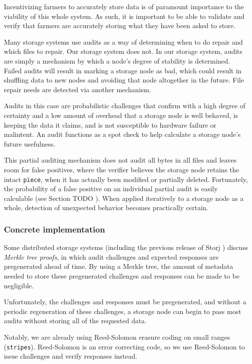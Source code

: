 \documentclass[a4paper,10pt]{article} \usepackage[utf8]{inputenc}
\newcommand{\x}[1]{{\tt #1}} \newcommand{\code}[1]{{\tt #1}}
\newcommand{\todo}[1]{{\color{red} TODO #1}}
\begin{document}
Incentivizing farmers to accurately store data is of paramount importance to
the viability of this whole system. As such, it is important to be able to
validate and verify that farmers are accurately storing what they have been
asked to store.

Many storage systems use audits as a way of determining when to do repair and
which files to repair. Our storage system does not. In our storage system,
audits are simply a mechanism by which a node's degree of stability is
determined. Failed audits will result in marking a storage node as bad, which
could result in shuffling data to new nodes and avoiding that node altogether
in the future. File repair needs are detected via another mechanism.

Audits in this case are probabilistic challenges that confirm with a high
degree of certainty and a low amount of overhead that a storage node is well
behaved, is keeping the data it claims, and is not susceptible to hardware
failure or malintent. An audit functions as a spot check to help calculate a
storage node's future usefulness.

This partial auditing mechanism does not audit all bytes in all files and
leaves room for false positives, where the verifier believes the storage node
retains the intact \x{piece}, when it has actually been modified or partially
deleted. Fortunately, the probability of a false positive on an individual
partial audit is easily calculable (see Section \todo{}). When applied
iteratively to a storage node as a whole, detection of unexpected behavior
becomes practically certain.

\subsubsection{Concrete implementation}

Some distributed storage systems (including the previous release of Storj
\cite{storj-v2}) discuss {\em Merkle tree proofs}, in which audit challenges
and expected responses are pregenerated ahead of time. By using a Merkle tree,
the amount of metadata needed to store these pregenerated challenges and
responses can be made to be negligible.

Unfortunately, the challenges and responses must be pregenerated, and without
a periodic regeneration of these challenges, a storage node can begin to pass
most audits without storing all of the requested data.

Notably, we are already using Reed-Solomon erasure coding \cite{rs} on small
ranges (\x{stripes}). Reed-Solomon is an error correcting code, so we use
Reed-Solomon to issue challenges and verify responses instead.
\end{document}
